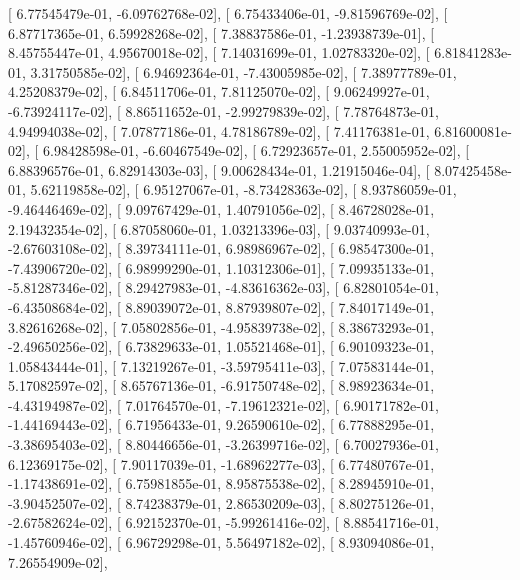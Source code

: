 \documentclass{article}
\begin{document}
       [  6.77545479e-01,  -6.09762768e-02],
       [  6.75433406e-01,  -9.81596769e-02],
       [  6.87717365e-01,   6.59928268e-02],
       [  7.38837586e-01,  -1.23938739e-01],
       [  8.45755447e-01,   4.95670018e-02],
       [  7.14031699e-01,   1.02783320e-02],
       [  6.81841283e-01,   3.31750585e-02],
       [  6.94692364e-01,  -7.43005985e-02],
       [  7.38977789e-01,   4.25208379e-02],
       [  6.84511706e-01,   7.81125070e-02],
       [  9.06249927e-01,  -6.73924117e-02],
       [  8.86511652e-01,  -2.99279839e-02],
       [  7.78764873e-01,   4.94994038e-02],
       [  7.07877186e-01,   4.78186789e-02],
       [  7.41176381e-01,   6.81600081e-02],
       [  6.98428598e-01,  -6.60467549e-02],
       [  6.72923657e-01,   2.55005952e-02],
       [  6.88396576e-01,   6.82914303e-03],
       [  9.00628434e-01,   1.21915046e-04],
       [  8.07425458e-01,   5.62119858e-02],
       [  6.95127067e-01,  -8.73428363e-02],
       [  8.93786059e-01,  -9.46446469e-02],
       [  9.09767429e-01,   1.40791056e-02],
       [  8.46728028e-01,   2.19432354e-02],
       [  6.87058060e-01,   1.03213396e-03],
       [  9.03740993e-01,  -2.67603108e-02],
       [  8.39734111e-01,   6.98986967e-02],
       [  6.98547300e-01,  -7.43906720e-02],
       [  6.98999290e-01,   1.10312306e-01],
       [  7.09935133e-01,  -5.81287346e-02],
       [  8.29427983e-01,  -4.83616362e-03],
       [  6.82801054e-01,  -6.43508684e-02],
       [  8.89039072e-01,   8.87939807e-02],
       [  7.84017149e-01,   3.82616268e-02],
       [  7.05802856e-01,  -4.95839738e-02],
       [  8.38673293e-01,  -2.49650256e-02],
       [  6.73829633e-01,   1.05521468e-01],
       [  6.90109323e-01,   1.05843444e-01],
       [  7.13219267e-01,  -3.59795411e-03],
       [  7.07583144e-01,   5.17082597e-02],
       [  8.65767136e-01,  -6.91750748e-02],
       [  8.98923634e-01,  -4.43194987e-02],
       [  7.01764570e-01,  -7.19612321e-02],
       [  6.90171782e-01,  -1.44169443e-02],
       [  6.71956433e-01,   9.26590610e-02],
       [  6.77888295e-01,  -3.38695403e-02],
       [  8.80446656e-01,  -3.26399716e-02],
       [  6.70027936e-01,   6.12369175e-02],
       [  7.90117039e-01,  -1.68962277e-03],
       [  6.77480767e-01,  -1.17438691e-02],
       [  6.75981855e-01,   8.95875538e-02],
       [  8.28945910e-01,  -3.90452507e-02],
       [  8.74238379e-01,   2.86530209e-03],
       [  8.80275126e-01,  -2.67582624e-02],
       [  6.92152370e-01,  -5.99261416e-02],
       [  8.88541716e-01,  -1.45760946e-02],
       [  6.96729298e-01,   5.56497182e-02],
       [  8.93094086e-01,   7.26554909e-02],
\end{document}
